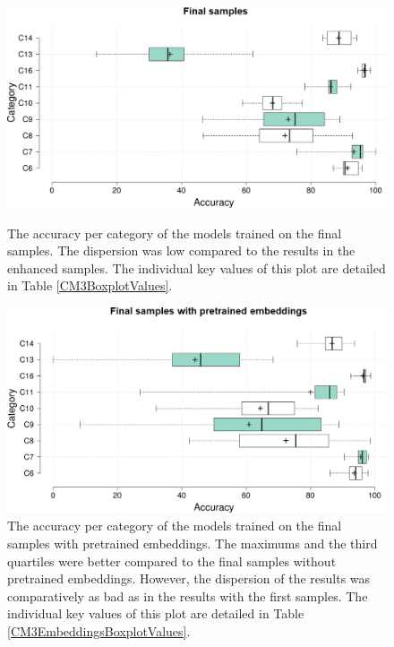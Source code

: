 \begin{figure}[]
 \begin{minipage}[t]{\textwidth}
    \centering
    \includegraphics[width =\textwidth]{Images/CM3Boxplot.png}
    \caption{The accuracy per category of the models trained on the final samples. The dispersion was low compared to the results in the enhanced samples. The individual key values of this plot are detailed in Table \ref{CM3BoxplotValues}.}
    \label{CM3Boxplot}
\end{minipage}

 \begin{minipage}[b]{\textwidth}
    \centering
    \includegraphics[width =\textwidth]{Images/CM3EmbeddingsBoxplot.png}
    \caption{The accuracy per category of the models trained on the final samples with pretrained embeddings. The maximums and the third quartiles were better compared to the final samples without pretrained embeddings. However, the dispersion of the results was comparatively as bad as in the results with the first samples. The individual key values of this plot are detailed in Table \ref{CM3EmbeddingsBoxplotValues}.}
    \label{CM3EmbeddingsBoxplot}
\end{minipage}
\end{figure} \hfill

